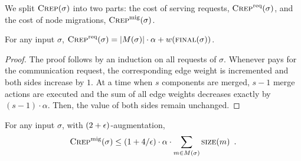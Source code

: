 We split 
$\textsc{Crep}(\sigma)$ into two parts: the cost of serving requests, $\textsc{Crep}^\textnormal{req}(\sigma)$, 
and the cost of node migrations, $\textsc{Crep}^\textnormal{mig}(\sigma)$. 

\begin{lemma}
\label{lem:crep_req}
For any input $\sigma$, $\textsc{Crep}^\textnormal{req}(\sigma) = |M(\sigma)| \cdot \alpha + w(\textsc{final}(\sigma))$.
\end{lemma}

\begin{proof}
The proof follows by an induction on all requests of $\sigma$. Whenever
\CREP pays for the communication request, the corresponding edge weight is
incremented and both sides increase by $1$. At a time when $s$ components
are merged, $s-1$ merge actions are executed and the sum of all edge weights
decreases exactly by $(s-1) \cdot \alpha$. Then, the value of both sides
remain unchanged.
\end{proof}

\begin{lemma}
\label{lem:crep_mig}
For any input $\sigma$, with $(2+\epsilon)$-augmentation, 
$$\textsc{Crep}^\textnormal{mig}(\sigma) \leq (1+4/\epsilon) \cdot \alpha \cdot \sum_{m \in M(\sigma)} \textsc{size}(m)\enspace.$$
\end{lemma}


